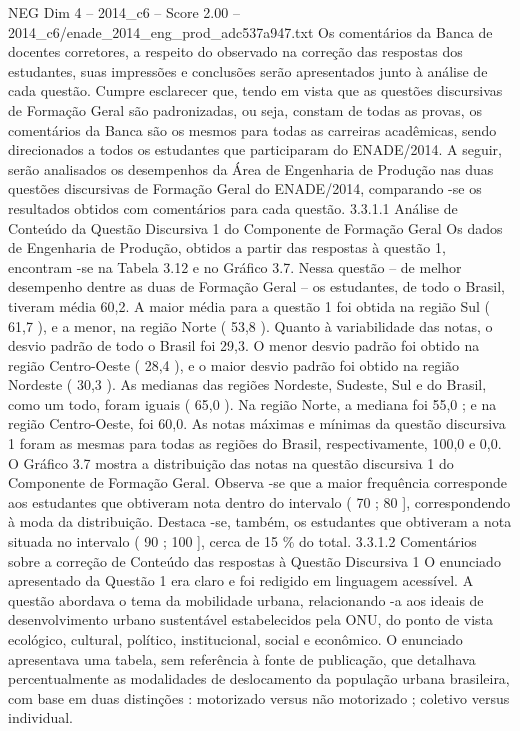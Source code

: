 \begin{textsample}{NEG Dim 4 – 2014\_c6 – Score 2.00 – 2014\_c6/enade\_2014\_eng\_prod\_adc537a947.txt}
Os comentários da Banca de docentes corretores, a respeito do observado na correção das respostas dos estudantes, suas impressões e conclusões serão apresentados junto à análise de cada questão.
Cumpre esclarecer que, tendo em vista que as questões discursivas de Formação Geral são padronizadas, ou seja, constam de todas as provas, os comentários da Banca são os mesmos para todas as carreiras acadêmicas, sendo direcionados a todos os estudantes que participaram do ENADE/2014.
A seguir, serão analisados os desempenhos da Área de Engenharia de Produção nas duas questões discursivas de Formação Geral do ENADE/2014, comparando -se os resultados obtidos com comentários para cada questão. 3.3.1.1 Análise de Conteúdo da Questão Discursiva 1 do Componente de Formação Geral Os dados de Engenharia de Produção, obtidos a partir das respostas à questão 1, encontram -se na Tabela 3.12 e no Gráfico 3.7.
Nessa questão – de melhor desempenho dentre as duas de Formação Geral – os estudantes, de todo o Brasil, tiveram média 60,2.
A maior média para a questão 1 foi obtida na região Sul ( 61,7 ), e a menor, na região Norte ( 53,8 ).
Quanto à variabilidade das notas, o desvio padrão de todo o Brasil foi 29,3.
O menor desvio padrão foi obtido na região Centro-Oeste ( 28,4 ), e o maior desvio padrão foi obtido na região Nordeste ( 30,3 ).
As medianas das regiões Nordeste, Sudeste, Sul e do Brasil, como um todo, foram iguais ( 65,0 ).
Na região Norte, a mediana foi 55,0 ; e na região Centro-Oeste, foi 60,0.
As notas máximas e mínimas da questão discursiva 1 foram as mesmas para todas as regiões do Brasil, respectivamente, 100,0 e 0,0.
O Gráfico 3.7 mostra a distribuição das notas na questão discursiva 1 do Componente de Formação Geral.
Observa -se que a maior frequência corresponde aos estudantes que obtiveram nota dentro do intervalo ( 70 ; 80 ], correspondendo à moda da distribuição.
Destaca -se, também, os estudantes que obtiveram a nota situada no intervalo ( 90 ; 100 ], cerca de 15 \% do total. 3.3.1.2 Comentários sobre a correção de Conteúdo das respostas à Questão Discursiva 1 O enunciado apresentado da Questão 1 era claro e foi redigido em linguagem acessível.
A questão abordava o tema da mobilidade urbana, relacionando -a aos ideais de desenvolvimento urbano sustentável estabelecidos pela ONU, do ponto de vista ecológico, cultural, político, institucional, social e econômico.
O enunciado apresentava uma tabela, sem referência à fonte de publicação, que detalhava percentualmente as modalidades de deslocamento da população urbana brasileira, com base em duas distinções : motorizado versus não motorizado ; coletivo versus individual.

\end{textsample}
